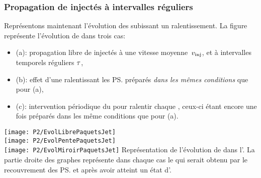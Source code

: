 \subsubsection{Propagation de \pss injectés à intervalles réguliers}
Représentons maintenant l'évolution des \patss subissant un ralentissement.
La figure~ représente l'évolution de \patss dans trois cas: 
\begin{itemize}
	\item (a): propagation libre de \pats injectés à une vitesse moyenne~$v_{{\rm {inj}}}$, et à intervalles temporels réguliers $\tau$,
	\item (b): effet d'une \secpent ralentissant les \ps préparés \emph{dans les mêmes conditions} que pour (a),
	\item (c): intervention périodique du \mimo pour ralentir chaque \p, ceux-ci étant encore une fois préparés dans les même conditions que pour (a).
\end{itemize}
%
\bfigs
\subfloat
{\label{fig:EvolLibrePaquetsJet}
\texttt{[image: P2/EvolLibrePaquetsJet]}
 }\\\RemonteUnPeuFig\RemonteUnPeuFig
\subfloat
{\label{fig:EvolPentePaquetsJet}
\texttt{[image: P2/EvolPentePaquetsJet]}
 }\\\RemonteUnPeuFig\RemonteUnPeuFig
\subfloat
{\label{fig:EvolMiroirPaquetsJet}
\texttt{[image: P2/EvolMiroirPaquetsJet]}\RemonteUnPeuFig
 }
 \RemonteUnPeuFig\RemonteUnPeuFig
{}
{Représentation de l'évolution de \patss dans l'\edpup. La partie droite des graphes représente dans chaque cas le \jat qui serait obtenu par le recouvrement des \ps et après avoir atteint un état d'\eqthdy.
\\
}
